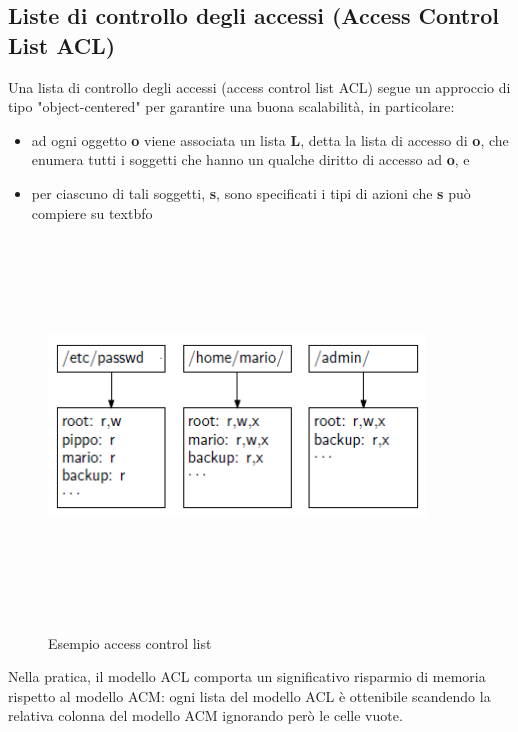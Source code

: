 \subsection{Liste di controllo degli accessi (Access Control List ACL)}
Una lista di controllo degli accessi (access control list ACL) segue un approccio di tipo "object-centered" per garantire una buona scalabilità, in particolare:
\begin{itemize} 
  \item ad ogni oggetto \textbf{o} viene associata un lista \textbf{L}, detta la lista di accesso di \textbf{o}, che enumera tutti i soggetti che hanno un qualche diritto di accesso ad \textbf{o}, e
  \item per ciascuno di tali soggetti, \textbf{s}, sono specificati i tipi di azioni che \textbf{s} può compiere su textbf{o}
\end{itemize}
\begin{figure}[htbp]
	\centering%
	\subfigure%
	{\includegraphics[height=10cm, width=10cm, keepaspectratio]{Immagini/Capitolo1/access_control_list_ex.png}}
	\caption{Esempio access control list \label{fig:acl}} 	
\end{figure}
Nella pratica, il modello ACL comporta un significativo risparmio di memoria rispetto al modello ACM: ogni lista del modello ACL è ottenibile scandendo la relativa colonna del modello ACM ignorando però le celle vuote.

